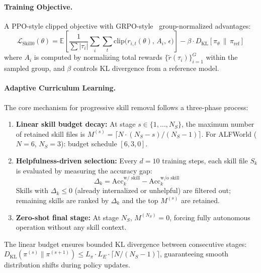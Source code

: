 \documentclass[11pt]{article}
\begin{document}
\paragraph{Training Objective.}
A PPO-style clipped objective with GRPO-style~\cite{grpo} group-normalized advantages:
\begin{equation}
    \mathcal{L}_{\mathrm{Skill0}}(\theta) = \mathbb{E}\!\left[\frac{1}{\sum|\tau_i|} \sum_i \sum_t \mathrm{clip}\!\big(r_{i,t}(\theta),\, A_i,\, \epsilon\big)\right] - \beta \cdot D_{\mathrm{KL}}[\pi_\theta \,\|\, \pi_{\mathrm{ref}}]
\end{equation}
where $A_i$ is computed by normalizing total rewards $\{\tilde{r}(\tau_i)\}_{i=1}^G$ within the sampled group, and $\beta$ controls KL divergence from a reference model.

\paragraph{Adaptive Curriculum Learning.}
The core mechanism for progressive skill removal follows a three-phase process:

\begin{enumerate}
    \item \textbf{Linear skill budget decay:} At stage $s \in \{1, \ldots, N_S\}$, the maximum number of retained skill files is $M^{(s)} = \lceil N \cdot (N_S - s) / (N_S - 1) \rceil$. For ALFWorld ($N\!=\!6$, $N_S\!=\!3$): budget schedule $[6, 3, 0]$.

    \item \textbf{Helpfulness-driven selection:} Every $d=10$ training steps, each skill file $S_k$ is evaluated by measuring the accuracy gap:
    \begin{equation}
        \Delta_k = \mathrm{Acc}_k^{\text{w/ skill}} - \mathrm{Acc}_k^{\text{w/o skill}}
    \end{equation}
    Skills with $\Delta_k \leq 0$ (already internalized or unhelpful) are filtered out; remaining skills are ranked by $\Delta_k$ and the top $M^{(s)}$ are retained.

    \item \textbf{Zero-shot final stage:} At stage $N_S$, $M^{(N_S)} = 0$, forcing fully autonomous operation without any skill context.
\end{enumerate}

The linear budget ensures bounded KL divergence between consecutive stages: $D_{\mathrm{KL}}(\pi^{(s)} \| \pi^{(s+1)}) \leq L_\pi \cdot L_E \cdot \lceil N/(N_S - 1) \rceil$, guaranteeing smooth distribution shifts during policy updates.
\end{document}
